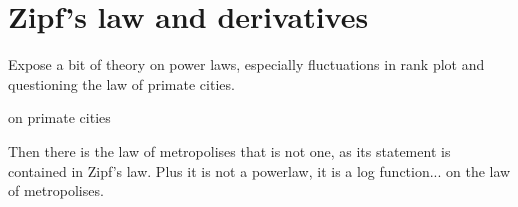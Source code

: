 %
\chapter{Zipf's law and derivatives}
\label{chap:zipf_law}

Expose a bit of theory on power laws, especially fluctuations in rank plot and
questioning the law of primate cities.

\cite{Jefferson:1989} on primate cities

Then there is the law of metropolises that is not one, as its statement is
contained in Zipf's law. Plus it is not a powerlaw, it is a log function...
\cite{Pumain:1997} on the law of metropolises.
